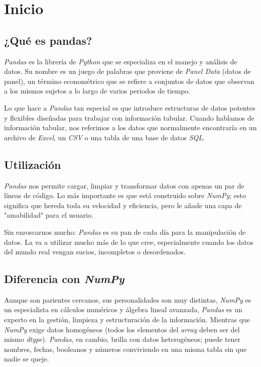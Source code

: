 \section{Inicio}

\subsection{¿Qué es pandas?}

\textit{Pandas} es la librería de \textit{Python} que se especializa en el manejo y análisis de datos. Su nombre es un juego de palabras que proviene de \textit{Panel Data} (datos de panel), un término econométrico que se refiere a conjuntos de datos que observan a los mismos sujetos a lo largo de varios periodos de tiempo.

Lo que hace a \textit{Pandas} tan especial es que introduce estructuras de datos potentes y flexibles diseñadas para trabajar con información tabular. Cuando hablamos de información tabular, nos referimos a los datos que normalmente encontraría en un archivo de \textit{Excel}, un \textit{CSV} o una tabla de una base de datos \textit{SQL}.

\subsection{Utilización}

\textit{Pandas} nos permite cargar, limpiar y transformar datos con apenas un par de líneas de código. Lo más importante es que está construido sobre \textit{NumPy}; esto significa que hereda toda su velocidad y eficiencia, pero le añade una capa de "amabilidad" para el usuario.

Sin enroscarnos mucho: \textit{Pandas} es su pan de cada día para la manipulación de datos. La va a utilizar mucho más de lo que cree, especialmente cuando los datos del mundo real vengan sucios, incompletos o desordenados.

\subsection{Diferencia con \textit{NumPy}}

Aunque son parientes cercanos, sus personalidades son muy distintas, \textit{NumPy} es un especialista en cálculos numéricos y álgebra lineal avanzada, \textit{Pandas} es un experto en la gestión, limpieza y estructuración de la información. Mientras que \textit{NumPy} exige datos homogéneos (todos los elementos del \textit{array} deben ser del mismo \textit{dtype}). \textit{Pandas}, en cambio, brilla con datos heterogéneos; puede tener nombres, fechas, booleanos y números conviviendo en una misma tabla sin que nadie se queje.

